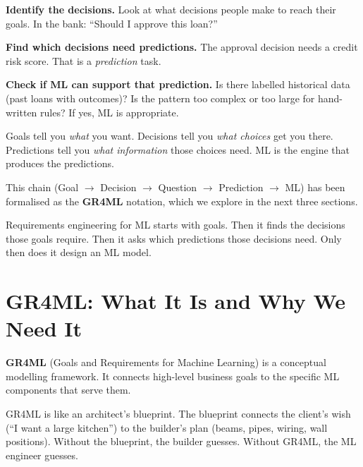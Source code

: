 \documentclass[a4paper,11pt]{article}
\newcommand{\vocab}[1]{\textbf{\color{navy}#1}}
\begin{document}
\begin{steps}
  \item \textbf{Identify the decisions.}
        Look at what decisions people make to reach their goals.
        In the bank: ``Should I approve this loan?''
  \item \textbf{Find which decisions need predictions.}
        The approval decision needs a credit risk score.
        That is a \emph{prediction} task.
  \item \textbf{Check if ML can support that prediction.}
        Is there labelled historical data (past loans with outcomes)?
        Is the pattern too complex or too large for hand-written rules?
        If yes, ML is appropriate.
\end{steps}

\begin{intuition}
Goals tell you \emph{what} you want.
Decisions tell you \emph{what choices} get you there.
Predictions tell you \emph{what information} those choices need.
ML is the engine that produces the predictions.
\end{intuition}

This chain (Goal $\to$ Decision $\to$ Question $\to$ Prediction $\to$ ML)
has been formalised as the \vocab{GR4ML} notation,
which we explore in the next three sections.

\begin{keytake}
Requirements engineering for ML starts with goals.
Then it finds the decisions those goals require.
Then it asks which predictions those decisions need.
Only then does it design an ML model.
\end{keytake}

\section{GR4ML: What It Is and Why We Need It}

\vocab{GR4ML} (Goals and Requirements for Machine Learning) is a conceptual
modelling framework. It connects high-level business goals to the specific ML
components that serve them.

\begin{intuition}
GR4ML is like an architect's blueprint.
The blueprint connects the client's wish (``I want a large kitchen'')
to the builder's plan (beams, pipes, wiring, wall positions).
Without the blueprint, the builder guesses.
Without GR4ML, the ML engineer guesses.
\end{intuition}
\end{document}
